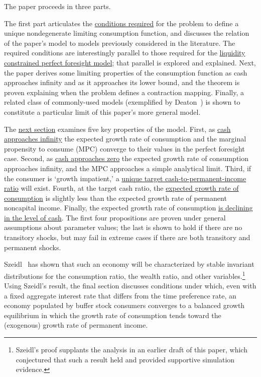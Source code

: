 \documentclass[./BufferStockTheory.tex]{subfiles}
\begin{document}
The paper proceeds in three parts.

The first part articulates the \hyperlink{Sufficient-Conditions}{conditions required} for the problem to define a unique nondegenerate limiting consumption function, and discusses the relation of the paper's model to models previously considered in the literature.  The required conditions are interestingly parallel to those required for the \hyperlink{Factors-Defined-And-Compared}{liquidity constrained perfect foresight model}; that parallel is explored and explained.  Next, the paper derives some limiting properties of the consumption function as cash approaches infinity and as it approaches its lower bound, and the theorem is proven explaining when the problem defines a contraction mapping.  Finally, a related class of commonly-used models (exemplified by Deaton~\citeyearpar{deatonLiqConstr}) is shown to constitute a particular limit of this paper's more general model.

The \hyperlink{AnalysisoftheConvergedConsumptionFunction}{next section} examines five key properties of the model. First, as \hyperlink{LimitsAsmtToInfty}{cash approaches infinity} the expected growth rate of consumption and the marginal propensity to consume (MPC) converge to their values in the perfect foresight case. Second, as \hyperlink{LimitsAsmtToZero}{cash approaches zero} the expected growth rate of consumption approaches infinity, and the MPC approaches a simple analytical limit.  Third, if the consumer is `growth impatient,' a \hyperlink{onetarget}{unique target cash-to-permanent-income ratio} will exist.  Fourth, at the target cash ratio, the \hyperlink{cGroLTpGro}{expected growth rate of consumption} is slightly less than the expected growth rate of permanent noncapital income.  Finally, the expected growth rate of consumption \hyperlink{dcgdxneg}{is declining in the level of cash}. The first four propositions are proven under general assumptions about parameter values; the last is shown to hold if there are no transitory shocks, but may fail in extreme cases if there are both transitory and permanent shocks.

Szeidl~\citeyearpar{szeidlInvariant} has shown that such an economy will be characterized by stable invariant distributions for the consumption ratio, the wealth ratio, and other variables.\footnote{Szeidl's proof supplants the analysis in an earlier draft of this paper, which conjectured that such a result held and provided supportive simulation evidence.}  Using Szeidl's result, the final section discusses conditions under which, even with a fixed aggregate interest rate that differs from the time preference rate, an economy populated by buffer stock consumers converges to a balanced growth equilibrium in which the growth rate of consumption tends toward the (exogenous) growth rate of permanent income.
\end{document}
